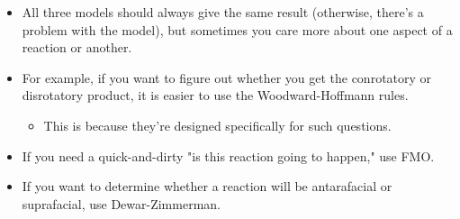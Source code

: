 \documentclass[../notes.tex]{subfiles}
\begin{document}
\begin{itemize}
\begin{itemize}
        \item All three models should always give the same result (otherwise, there's a problem with the model), but sometimes you care more about one aspect of a reaction or another.
        \item For example, if you want to figure out whether you get the conrotatory or disrotatory product, it is easier to use the Woodward-Hoffmann rules.
        \begin{itemize}
            \item This is because they're designed specifically for such questions.
        \end{itemize}
        \item If you need a quick-and-dirty "is this reaction going to happen," use FMO.
        \item If you want to determine whether a reaction will be antarafacial or suprafacial, use Dewar-Zimmerman.
    \end{itemize}
\end{itemize}
\end{document}
